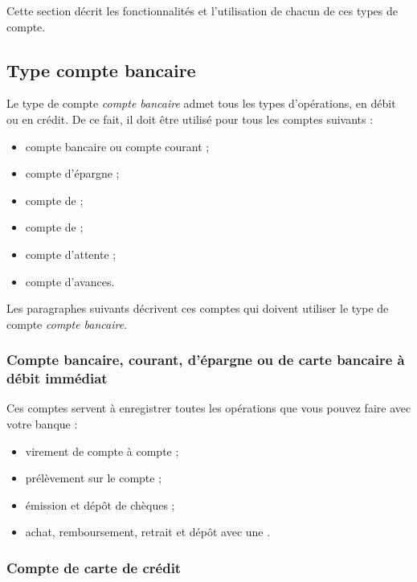 Cette section décrit les fonctionnalités et l'utilisation de chacun de ces types de compte.


\subsection{Type compte bancaire\label{accounts-type-bank}}

Le type de compte \emph{compte bancaire} admet tous les types d'opérations, en débit ou en crédit. De ce fait, il doit être utilisé pour tous les comptes suivants :
\begin{itemize}
	\item compte bancaire ou compte courant ;
	\item compte d'épargne ;
	\item compte de	 ;
	\item compte de  ;		
	\item compte d'attente ;
	\item compte d'avances. 
\end{itemize}

Les paragraphes suivants décrivent ces comptes qui doivent utiliser le type de compte \emph{compte bancaire}.


\subsubsection{Compte bancaire, courant, d'épargne ou de carte bancaire à débit immédiat\label{accounts-type-bank-misc}}

Ces comptes servent à enregistrer toutes les opérations que vous pouvez faire avec votre banque : 

\begin{itemize}
	\item virement de compte à compte ;
	\item prélèvement sur le compte ;
	\item émission et dépôt de chèques ; 
	\item achat, remboursement, retrait et dépôt avec une . 
\end{itemize}


\subsubsection{Compte de carte de crédit\label{accounts-type-bank-creditcard}}


